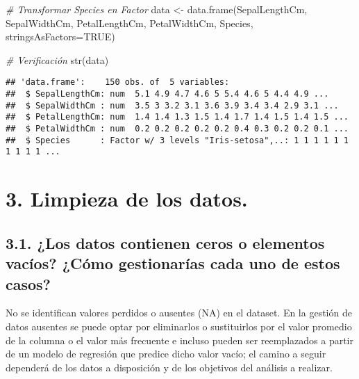 \documentclass[
]{article}
\newenvironment{Shaded}{\begin{snugshade}}{\end{snugshade}}
\newcommand{\AttributeTok}[1]{\textcolor[rgb]{0.77,0.63,0.00}{#1}}
\newcommand{\CommentTok}[1]{\textcolor[rgb]{0.56,0.35,0.01}{\textit{#1}}}
\newcommand{\ConstantTok}[1]{\textcolor[rgb]{0.00,0.00,0.00}{#1}}
\newcommand{\FunctionTok}[1]{\textcolor[rgb]{0.00,0.00,0.00}{#1}}
\newcommand{\NormalTok}[1]{#1}
\newcommand{\OtherTok}[1]{\textcolor[rgb]{0.56,0.35,0.01}{#1}}
\begin{document}
\begin{Shaded}
\begin{Highlighting}[]
\CommentTok{\# Transformar Species en Factor}
\NormalTok{data }\OtherTok{\textless{}{-}} \FunctionTok{data.frame}\NormalTok{(SepalLengthCm, SepalWidthCm, PetalLengthCm, PetalWidthCm, }
\NormalTok{                   Species, }\AttributeTok{stringsAsFactors=}\ConstantTok{TRUE}\NormalTok{)}
\end{Highlighting}
\end{Shaded}

\begin{Shaded}
\begin{Highlighting}[]
\CommentTok{\# Verificación}
\FunctionTok{str}\NormalTok{(data)}
\end{Highlighting}
\end{Shaded}

\begin{verbatim}
## 'data.frame':    150 obs. of  5 variables:
##  $ SepalLengthCm: num  5.1 4.9 4.7 4.6 5 5.4 4.6 5 4.4 4.9 ...
##  $ SepalWidthCm : num  3.5 3 3.2 3.1 3.6 3.9 3.4 3.4 2.9 3.1 ...
##  $ PetalLengthCm: num  1.4 1.4 1.3 1.5 1.4 1.7 1.4 1.5 1.4 1.5 ...
##  $ PetalWidthCm : num  0.2 0.2 0.2 0.2 0.2 0.4 0.3 0.2 0.2 0.1 ...
##  $ Species      : Factor w/ 3 levels "Iris-setosa",..: 1 1 1 1 1 1 1 1 1 1 ...
\end{verbatim}

\hypertarget{limpieza-de-los-datos.}{%
\section{3. Limpieza de los datos.}\label{limpieza-de-los-datos.}}

\hypertarget{los-datos-contienen-ceros-o-elementos-vacuxedos-cuxf3mo-gestionaruxedas-cada-uno-de-estos-casos}{%
\subsection{3.1. ¿Los datos contienen ceros o elementos vacíos? ¿Cómo
gestionarías cada uno de estos
casos?}\label{los-datos-contienen-ceros-o-elementos-vacuxedos-cuxf3mo-gestionaruxedas-cada-uno-de-estos-casos}}

No se identifican valores perdidos o ausentes (NA) en el dataset. En la
gestión de datos ausentes se puede optar por eliminarlos o sustituirlos
por el valor promedio de la columna o el valor más frecuente e incluso
pueden ser reemplazados a partir de un modelo de regresión que predice
dicho valor vacío; el camino a seguir dependerá de los datos a
disposición y de los objetivos del análisis a realizar.
\end{document}
